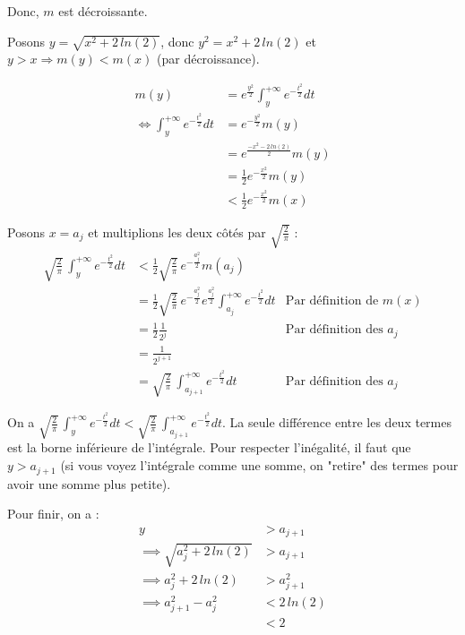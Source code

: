 Donc, $m$ est décroissante.

\newpage

Posons $y = \sqrt{x^2 + 2\,ln(2)}$, donc $y^2 = x^2 + 2\,ln(2)$ et $y > x \Rightarrow m(y) < m(x)$ (par décroissance).

\begin{align*}
    m(y) &= e^\frac{y^2}{2} \int_y^{+\infty}e^{-\frac{t^2}{2}} dt \\
    \iff \int_y^{+\infty}e^{-\frac{t^2}{2}} dt & = e^{-\frac{y^2}{2}} m(y) \\
    & = e^{\frac{-x^2 - 2\,ln(2)}{2}} m(y)\\
    & = \frac{1}{2} e^{-\frac{x^2}{2}}m(y) \\
    & < \frac{1}{2} e^{-\frac{x^2}{2}}m(x)
\end{align*}

Posons $x = a_j$ et multiplions les deux côtés par $\sqrt{\frac{2}{\pi}}$ :
\begin{align*}
    \sqrt{\frac{2}{\pi}}\,\int_y^{+\infty} e^{-\frac{t^2}{2}}dt & < \frac{1}{2}\sqrt{\frac{2}{\pi}}\,e^{-\frac{a_j^2}{2}} m(a_j)\\
    & = \frac{1}{2}\sqrt{\frac{2}{\pi}}\,e^{-\frac{a_j^2}{2}} e^\frac{a_j^2}{2}\int_{a_j}^{+\infty}e^{-\frac{t^2}{2}} dt & \text{Par définition de $m(x)$}\\
    & = \frac{1}{2} \frac{1}{2^j} & \text{Par définition des $a_j$} \\
    & = \frac{1}{2^{j+1}} \\
    & = \sqrt{\frac{2}{\pi}}\,\int_{a_{j+1}}^{+\infty} e^{-\frac{t^2}{2}} dt & \text{Par définition des $a_j$}
\end{align*}

On a $\sqrt{\frac{2}{\pi}}\,\int_y^{+\infty} e^{-\frac{t^2}{2}}dt < \sqrt{\frac{2}{\pi}}\,\int_{a_{j+1}}^{+\infty} e^{-\frac{t^2}{2}} dt$. La seule différence entre les deux termes est la borne inférieure de l'intégrale. Pour respecter l'inégalité, il faut que $y > a_{j+1}$ (si vous voyez l'intégrale comme une somme, on "retire" des termes pour avoir une somme plus petite).

Pour finir, on a :
\begin{align*}
    y & > a_{j+1}\\
    \implies \sqrt{a_j^2 + 2\,ln(2)} &> a_{j+1}\\
    \implies a_j^2+2\,ln(2) & > a_{j+1}^2\\
    \implies a_{j+1}^2 - a_j^2 &< 2\,ln(2)\\
    & < 2
\end{align*}

